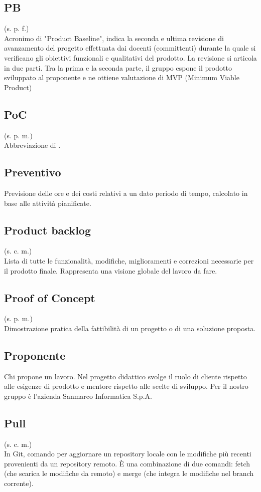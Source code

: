     \subsection{PB}
    \label{PB}
    (s. p. f.)\\
    Acronimo di "Product Baseline", indica la seconda e ultima revisione di avanzamento del progetto effettuata dai docenti (committenti) durante la quale si verificano gli obiettivi funzionali e qualitativi del prodotto. La revisione si articola in due parti. Tra la prima e la seconda parte, il gruppo espone il prodotto sviluppato al proponente e ne ottiene valutazione di MVP (Minimum Viable Product)
    \subsection{PoC}
    (s. p. m.)\\
    Abbreviazione di .
    \subsection{Preventivo}
    Previsione delle ore e dei costi relativi a un dato periodo di tempo,
    calcolato in base alle attività pianificate.
    \subsection{Product backlog}
    \label{Product backlog}
    (s. c. m.)\\
    Lista di tutte le funzionalità, modifiche, miglioramenti e correzioni necessarie 
    per il prodotto finale. Rappresenta una visione globale del lavoro da fare.
    \subsection{Proof of Concept}
    \label{Proof of Concept}
    (s. p. m.)\\
    Dimostrazione pratica della fattibilità di un progetto o di una soluzione proposta.
    \subsection{Proponente}
    \label{Proponente}
    Chi propone un lavoro. Nel progetto didattico svolge il ruolo di cliente 
    rispetto alle esigenze di prodotto e mentore rispetto alle scelte di sviluppo.
    Per il nostro gruppo è l'azienda Sanmarco Informatica S.p.A.
    \subsection{Pull}
    (s. c. m.)\\
    In Git, comando per aggiornare un repository locale con le modifiche più recenti provenienti 
    da un repository remoto. È una combinazione di due comandi: fetch (che scarica le modifiche 
    da remoto) e merge (che integra le modifiche nel branch corrente).
